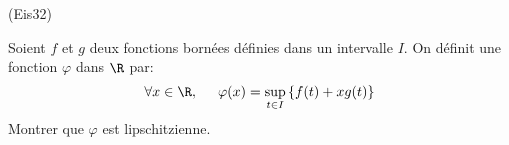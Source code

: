 \begin{tiny}(Eis32)\end{tiny} Soient $f$ et $g$ deux fonctions bornées définies dans un intervalle $I$. On définit une fonction 
$\varphi$ dans $\R$ par:
\begin{displaymath}
 \forall x\in \R,\hspace{0.5cm}
\varphi(x)=\sup_{t\in I}\left\lbrace f(t)+xg(t)\right\rbrace 
\end{displaymath}
 Montrer que $\varphi$ est lipschitzienne.